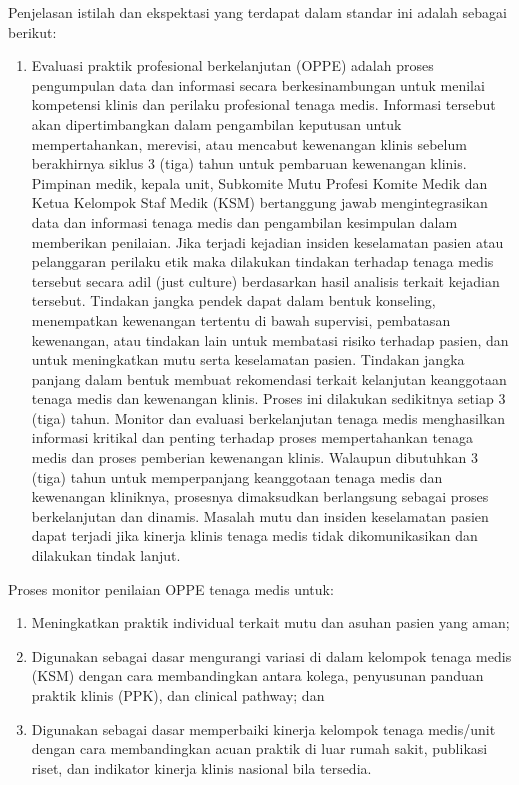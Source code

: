 \documentclass[
]{book}
\providecommand{\tightlist}{%
  \setlength{\itemsep}{0pt}\setlength{\parskip}{0pt}}
\begin{document}
Penjelasan istilah dan ekspektasi yang terdapat dalam standar ini adalah sebagai berikut:

\begin{enumerate}
\def\labelenumi{\alph{enumi}.}
\tightlist
\item
  Evaluasi praktik profesional berkelanjutan (OPPE) adalah proses pengumpulan data dan informasi secara berkesinambungan untuk menilai kompetensi klinis dan perilaku profesional tenaga medis.
  Informasi tersebut akan dipertimbangkan dalam pengambilan keputusan untuk mempertahankan, merevisi, atau mencabut kewenangan klinis sebelum berakhirnya siklus 3 (tiga) tahun untuk pembaruan kewenangan klinis.
  Pimpinan medik, kepala unit, Subkomite Mutu Profesi Komite Medik dan Ketua Kelompok Staf Medik (KSM) bertanggung jawab mengintegrasikan data dan informasi tenaga medis dan pengambilan kesimpulan dalam memberikan penilaian.
  Jika terjadi kejadian insiden keselamatan pasien atau pelanggaran perilaku etik maka dilakukan tindakan terhadap tenaga medis tersebut secara adil (just culture) berdasarkan hasil analisis terkait kejadian tersebut.
  Tindakan jangka pendek dapat dalam bentuk konseling, menempatkan kewenangan tertentu di bawah supervisi, pembatasan kewenangan, atau tindakan lain untuk membatasi risiko terhadap pasien, dan untuk meningkatkan mutu serta keselamatan pasien. Tindakan jangka panjang dalam bentuk membuat rekomendasi terkait kelanjutan keanggotaan tenaga medis dan kewenangan klinis.
  Proses ini dilakukan sedikitnya setiap 3 (tiga) tahun. Monitor dan evaluasi berkelanjutan tenaga medis menghasilkan informasi kritikal dan penting terhadap proses mempertahankan tenaga medis dan proses pemberian kewenangan klinis. Walaupun dibutuhkan 3 (tiga) tahun untuk memperpanjang keanggotaan tenaga medis dan kewenangan kliniknya, prosesnya dimaksudkan berlangsung sebagai proses berkelanjutan dan dinamis.
  Masalah mutu dan insiden keselamatan pasien dapat terjadi jika kinerja klinis tenaga medis tidak dikomunikasikan dan dilakukan tindak lanjut.
\end{enumerate}

Proses monitor penilaian OPPE tenaga medis untuk:

\begin{enumerate}
\def\labelenumi{\arabic{enumi}.}
\tightlist
\item
  Meningkatkan praktik individual terkait mutu dan asuhan pasien yang aman;
\item
  Digunakan sebagai dasar mengurangi variasi di dalam kelompok tenaga medis (KSM) dengan cara membandingkan antara kolega, penyusunan panduan praktik klinis (PPK), dan clinical pathway; dan
\item
  Digunakan sebagai dasar memperbaiki kinerja kelompok tenaga medis/unit dengan cara membandingkan acuan praktik di luar rumah sakit, publikasi riset, dan indikator kinerja klinis nasional bila tersedia.
\end{enumerate}
\end{document}

